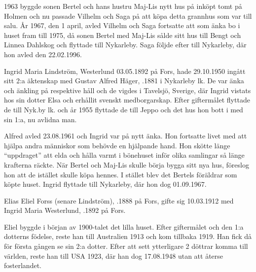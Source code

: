 1963 byggde sonen Bertel och hans hustru Maj-Lis nytt hus på inköpt tomt på Holmen och nu passade Vilhelm och Saga på att köpa detta grannhus som var till salu. År 1967, den 1 april, avled Vilhelm och Saga fortsatte att som änka bo i huset fram till 1975, då sonen Bertel med Maj-Lis sålde sitt hus till Bengt och Linnea Dahlskog och flyttade till Nykarleby. Saga följde efter till Nykarleby, där hon avled den 22.02.1996.


Ingrid Maria Lindström, \textborn Westerlund 03.05.1892 på Fors, hade 29.10.1950 ingått sitt 2:a äktenskap med Gustav Alfred Häger, .1881 i Nykarleby lk. De var änka och änkling på respektive håll och de vigdes i Tavelsjö, Sverige, där Ingrid vistats hos sin dotter Elsa och erhållit svenskt medborgarskap. Efter giftermålet flyttade de till Nyk.by lk. och år 1955 flyttade de till Jeppo och det hus hon bott i med sin 1:a, nu avlidna man.

Alfred avled 23.08.1961 och Ingrid var på nytt änka. Hon fortsatte livet med att hjälpa andra människor som behövde en hjälpande hand. Hon   skötte   länge ``uppdraget'' att elda och hålla varmt i bönehuset inför olika samlingar så länge krafterna räckte. När Bertel och Maj-Lis skulle börja bygga sitt nya hus, föreslog hon att de istället skulle köpa hennes. I stället blev det Bertels föräldrar som köpte huset. Ingrid flyttade till Nykarleby, där hon dog 01.09.1967.


Elias Eliel Forss (senare Lindström), .1888 på Fors, gifte sig 10.03.1912 med Ingrid Maria Westerlund, .1892  på Fors.

Eliel byggde i början av 1900-talet det lilla huset. Efter giftermålet och den 1:a dotterns födelse, reste han till Australien 1913 och kom tillbaka 1919. Han fick då för första gången se sin 2:a dotter. Efter att sett ytterligare 2 döttrar komma till världen, reste han till USA 1923, där han dog 17.08.1948 utan att återse fosterlandet.
\begin{jhchildren}
  \item {}
  \item {}
  \item {}
  \item {}
\end{jhchildren}



